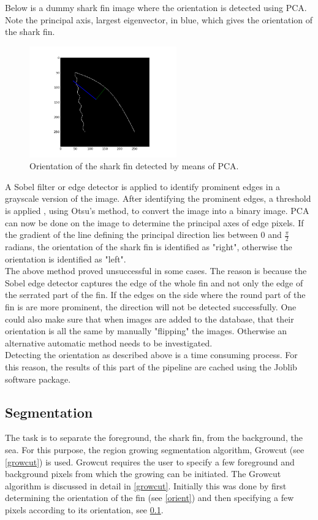 \documentclass[a4paper,10pt]{article}
\begin{document}
Below is a dummy shark fin image where the orientation is detected using PCA.
Note the principal axis, largest eigenvector, in blue, which gives the
orientation of the shark fin.
\begin{figure}[H]
 \centering
 \includegraphics[width=2.5in]{orientation.jpg}
 \caption{Orientation of the shark fin detected by means of PCA.}
 \label{orientation}
\end{figure}

A Sobel filter or edge detector is applied 
to identify prominent edges in a grayscale version of the image.  After identifying the prominent edges, 
a threshold is applied , using Otsu's method, to convert the image into a binary image.
PCA can now be done on
the image to determine the principal axes of edge pixels.  If the gradient
of the line defining the principal direction lies between 0 and
$\frac{\pi}{2}$ radians, the orientation of the shark fin is
identified as
"right", otherwise the orientation is identified as "left".  \\

The above method proved unsuccessful in some cases.  The reason is because the Sobel edge detector captures 
the edge of the whole fin and not only the edge of the serrated part of the fin.  If the edges
on the side where the round part of the fin is are more prominent, the direction will not be detected successfully. 
One could also make sure that when images are added to the database, that their orientation is all the same by manually
"flipping" the images.  Otherwise an alternative automatic method needs to be investigated. \\

Detecting the orientation as described above is a time consuming process.  For this reason, the results of this part of the
pipeline are cached using the Joblib software package.


\subsection{Segmentation}
\label{segmentation}
The task is to separate the foreground, the shark fin, from the background,
the sea.  For this purpose, the region growing segmentation algorithm,
Growcut (see \ref{growcut}) is used.  Growcut requires the user to specify a few
foreground and background pixels from which the growing can be
initiated. The Growcut
  algorithm is discussed in detail in \ref{growcut}.
Initially this was done by first determining the orientation of the fin (see
\ref{orient}) and then specifying a few pixels according to its orientation, see 
\ref{segmentation}.  \\
\end{document}
